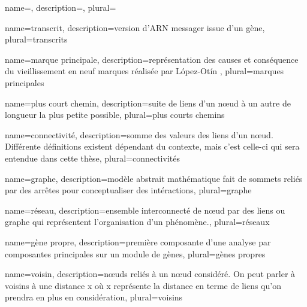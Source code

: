 
\printglossary[nonumberlist]






\newglossaryentry{}
{
	name={},
	description={}, 
	plural={}
}

{
	name={transcrit},
	description={version d'ARN messager issue d'un gène}, 
	plural={transcrits}
}

{
	name={marque principale},
	description={représentation des causes et conséquence du vieillissement en neuf marques réalisée par López-Otín \cite{Lopez-Otin2013}}, 
	plural={marques principales}
}

{
	name={plus court chemin},
	description={suite de liens d'un nœud à un autre de longueur la plus petite possible}, 
	plural={plus courts chemins}
}

{
	name={connectivité},
	description={somme des valeurs des liens d'un nœud. Différente définitions existent dépendant du contexte, mais c'est celle-ci qui sera entendue dans cette thèse}, 
	plural={connectivités}
}

{
	name={graphe},
	description={modèle abstrait mathématique fait de sommets reliés par des arrêtes pour conceptualiser des intéractions}, 
	plural={graphe}
}

{
	name={réseau},
	description={ensemble interconnecté de nœud par des liens ou graphe qui représentent l'organisation d'un phénomène.}, 
	plural={réseaux}
}

{
	name={gène propre},
	description={première composante d'une analyse par composantes principales sur un module de gènes}, 
	plural={gènes propres}
}

{
	name={voisin},
	description={nœuds reliés à un nœud considéré. On peut parler à voisins à une distance x où x représente la distance en terme de liens qu'on prendra en plus en considération}, 
	plural={voisins}
}


